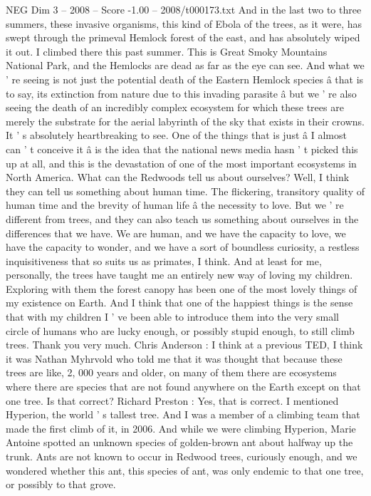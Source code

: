 \begin{textsample}{NEG Dim 3 – 2008 – Score -1.00 – 2008/t000173.txt}
And in the last two to three summers, these invasive organisms, this kind of Ebola of the trees, as it were, has swept through the primeval Hemlock forest of the east, and has absolutely wiped it out.
I climbed there this past summer.
This is Great Smoky Mountains National Park, and the Hemlocks are dead as far as the eye can see.
And what we ' re seeing is not just the potential death of the Eastern Hemlock species â that is to say, its extinction from nature due to this invading parasite â but we ' re also seeing the death of an incredibly complex ecosystem for which these trees are merely the substrate for the aerial labyrinth of the sky that exists in their crowns.
It ' s absolutely heartbreaking to see.
One of the things that is just â I almost can ' t conceive it â is the idea that the national news media hasn ' t picked this up at all, and this is the devastation of one of the most important ecosystems in North America.
What can the Redwoods tell us about ourselves?
Well, I think they can tell us something about human time.
The flickering, transitory quality of human time and the brevity of human life â the necessity to love.
But we ' re different from trees, and they can also teach us something about ourselves in the differences that we have.
We are human, and we have the capacity to love, we have the capacity to wonder, and we have a sort of boundless curiosity, a restless inquisitiveness that so suits us as primates, I think.
And at least for me, personally, the trees have taught me an entirely new way of loving my children.
Exploring with them the forest canopy has been one of the most lovely things of my existence on Earth.
And I think that one of the happiest things is the sense that with my children I ' ve been able to introduce them into the very small circle of humans who are lucky enough, or possibly stupid enough, to still climb trees.
Thank you very much.
Chris Anderson : I think at a previous TED, I think it was Nathan Myhrvold who told me that it was thought that because these trees are like, 2, 000 years and older, on many of them there are ecosystems where there are species that are not found anywhere on the Earth except on that one tree.
Is that correct?
Richard Preston : Yes, that is correct.
I mentioned Hyperion, the world ' s tallest tree.
And I was a member of a climbing team that made the first climb of it, in 2006.
And while we were climbing Hyperion, Marie Antoine spotted an unknown species of golden-brown ant about halfway up the trunk.
Ants are not known to occur in Redwood trees, curiously enough, and we wondered whether this ant, this species of ant, was only endemic to that one tree, or possibly to that grove.

\end{textsample}
